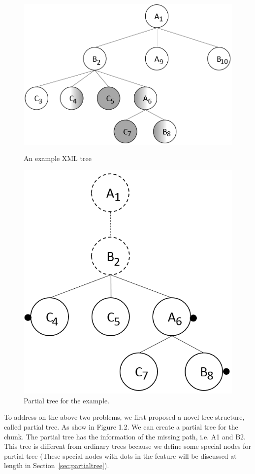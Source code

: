 \begin{figure}[t]
\centering\includegraphics[scale=0.3]{introduction/figures/exampletree.png}
\caption{An example XML tree} \label{fig:exampletree}
\centering\includegraphics[scale=0.3]{introduction/figures/examplepartialtree.png}
\caption{Partial tree for the example.} \label{fig:examplepartialtree}
\end{figure}

To address on the above two problems, we first proposed a novel tree structure,
called partial tree. As show in Figure 1.2.  We can create a partial tree for
the chunk. The partial tree has the information  of the missing path, i.e. A1
and B2. This tree is different from ordinary trees  because we define some
special nodes for partial tree (These special nodes with  dots in the feature
will be discussed at length in Section~\ref{sec:partialtree}).

